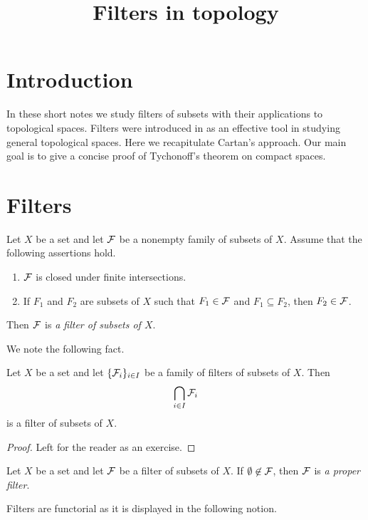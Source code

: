 



\title{Filters in topology}
\date{}
\maketitle

\section{Introduction}
\noindent
In these short notes we study filters of subsets with their applications to topological spaces. Filters were introduced in \cite{cartan1937filters} as an effective tool in studying general topological spaces. Here we recapitulate Cartan's approach. Our main goal is to give a concise proof of Tychonoff's theorem on compact spaces.

\section{Filters}

\begin{definition}
Let $X$ be a set and let ${\mathcal F}$ be a nonempty family of subsets of $X$. Assume that the following assertions hold.
\begin{enumerate}[label=\textbf{(\arabic*)}, leftmargin=*]
\item ${\mathcal F}$ is closed under finite intersections.
\item If $F_1$ and $F_2$ are subsets of $X$ such that $F_1 \in {\mathcal F}$ and $F_1\subseteq F_2$, then $F_2 \in {\mathcal F}$.
\end{enumerate}
Then ${\mathcal F}$ is \textit{a filter of subsets of $X$}.
\end{definition}
\noindent
We note the following fact. 

\begin{fact}\label{fact:filters_are_closed_under_intersections}
Let $X$ be a set and let $\{{\mathcal F}_i\}_{i\in I}$ be a family of filters of subsets of $X$. Then 
$$\bigcap_{i\in I}{\mathcal F}_i$$
is a filter of subsets of $X$.
\end{fact}
\begin{proof}
Left for the reader as an exercise.
\end{proof}

\begin{definition}
Let $X$ be a set and let ${\mathcal F}$ be a filter of subsets of $X$. If $\emptyset \not \in {\mathcal F}$, then ${\mathcal F}$ is \textit{a proper filter}.
\end{definition}
\noindent
Filters are functorial as it is displayed in the following notion. 

